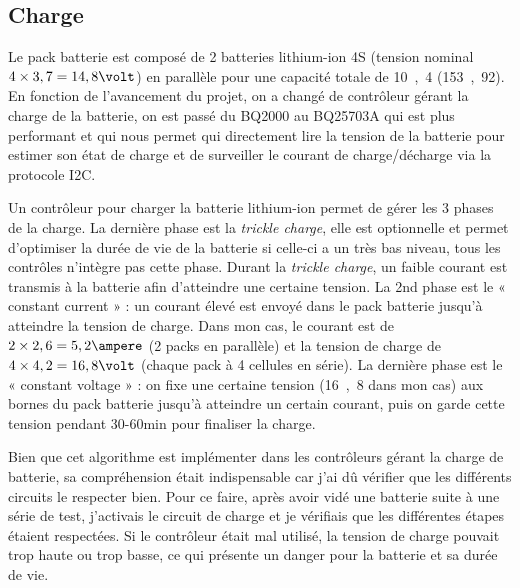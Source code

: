 \documentclass[a4paper, 11pt]{report}
\begin{document}
\subsection{Charge}
Le pack batterie est composé de 2 batteries lithium-ion 4S (tension nominal $4\times3,7=14,8\volt$) en parallèle pour une capacité totale de \unit{10,4}{\ampere\hour} (\unit{153,92}{\watt\hour}). En fonction de l’avancement du projet, on a changé de contrôleur gérant la charge de la batterie, on est passé du BQ2000 au BQ25703A qui est plus performant et qui nous permet qui directement lire la tension de la batterie pour estimer son état de charge et de surveiller le courant de charge/décharge via la protocole I2C.

Un contrôleur pour charger la batterie lithium-ion permet de gérer les 3 phases de la charge. La dernière phase est la \emph{trickle charge}, elle est optionnelle et permet d’optimiser la durée de vie de la batterie si celle-ci a un très bas niveau, tous les contrôles n’intègre pas cette phase. Durant la \emph{trickle charge}, un faible courant est transmis à la batterie afin d’atteindre une certaine tension. La 2nd phase est le « constant current » : un courant élevé est envoyé dans le pack batterie jusqu’à atteindre la tension de charge. Dans mon cas, le courant est de $2\times2,6 = 5,2 \ampere$ (2 packs en parallèle) et la tension de charge de $4\times4,2 = 16,8 \volt$ (chaque pack à 4 cellules en série). La dernière phase est le « constant voltage » : on fixe une certaine tension (\unit{16,8}{\volt} dans mon cas) aux bornes du pack batterie jusqu’à atteindre un certain courant, puis on garde cette tension pendant 30-60min pour finaliser la charge.

Bien que cet algorithme est implémenter dans les contrôleurs gérant la charge de batterie, sa compréhension était indispensable car j'ai dû vérifier que les différents circuits le respecter bien. Pour ce faire, après avoir vidé une batterie suite à une série de test, j'activais le circuit de charge et je vérifiais que les différentes étapes étaient respectées. Si le contrôleur était mal utilisé, la tension de charge pouvait trop haute ou trop basse, ce qui présente un danger pour la batterie et sa durée de vie.
\end{document}
